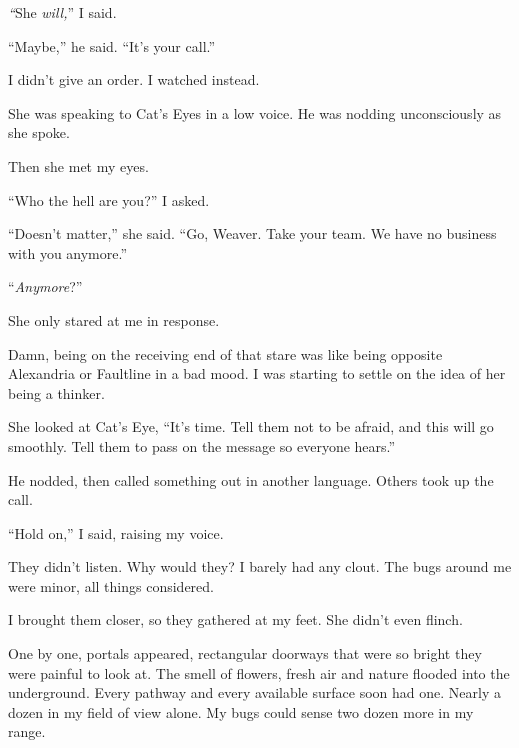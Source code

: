 \emph{``}She\emph{ will,}'' I said.



``Maybe,'' he said.  ``It's your call.''



I didn't give an order.  I watched instead.



She was speaking to Cat's Eyes in a low voice.  He was nodding unconsciously as she spoke.



Then she met my eyes.



``Who the hell are you?''  I asked.



``Doesn't matter,'' she said.  ``Go, Weaver.  Take your team.  We have no business with you anymore.''



``\emph{Anymore}?''



She only stared at me in response.



Damn, being on the receiving end of that stare was like being opposite Alexandria or Faultline in a bad mood.  I was starting to settle on the idea of her being a thinker.



She looked at Cat's Eye, ``It's time.  Tell them not to be afraid, and this will go smoothly.  Tell them to pass on the message so everyone hears.''



He nodded, then called something out in another language.  Others took up the call.



``Hold on,'' I said, raising my voice.



They didn't listen.  Why would they?  I barely had any clout.  The bugs around me were minor, all things considered.



I brought them closer, so they gathered at my feet.  She didn't even flinch.



One by one, portals appeared, rectangular doorways that were so bright they were painful to look at.  The smell of flowers, fresh air and nature flooded into the underground.  Every pathway and every available surface soon had one.  Nearly a dozen in my field of view alone.  My bugs could sense two dozen more in my range.



